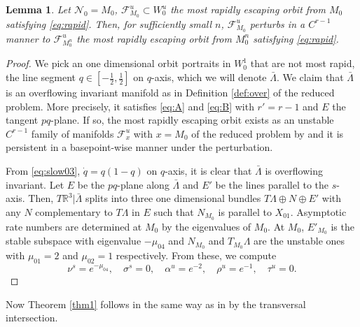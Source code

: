 \documentclass[a4paper,11pt]{article}
\newtheorem{lemma}{Lemma}[section]
\theoremstyle{remark}
\begin{document}
\begin{lemma} \label{lem:rapid}
 Let $\mathcal{N}_0=M_0$, $\mathcal{F}^u_{M_0}\subset W_0^u$ the most rapidly escaping orbit from $M_0$ satisfying \eqref{eq:rapid}. Then, for sufficiently small $n$, $\mathcal{F}^u_{M_0}$ perturbs in a $C^{r-1}$ manner to $\mathcal{F}^u_{M_0^n}$ the most rapidly escaping orbit from $M_0^n$ satisfying \eqref{eq:rapid}. 
\end{lemma}
\begin{proof}
 We pick an one dimensional orbit portraits in $W_0^1$ that are not most rapid, the line segment $q\in [- \frac{1}{2}, \frac{1}{2}]$ on $q$-axis, which we will denote $\bar{\Lambda}$. We claim that $\bar\Lambda$ is an overflowing invariant manifold as in Definition \ref{def:over} of the reduced problem. More precisely, it satisfies \eqref{eq:A} and \eqref{eq:B} with $r'=r-1$ and $E$ the tangent $pq$-plane. If so, the most rapidly escaping orbit exists as an unstable $C^{r-1}$ family of manifolds $\mathcal{F}^u_x$ with $x=M_0$ of the reduced problem by \cite[Theorem 3]{fenichel_asymptotic_1977} and it is persistent in a basepoint-wise manner under the perturbation.
 
 From \eqref{eq:slow03}, $\dot{q}=q(1-q)$ on $q$-axis, it is clear that $\bar\Lambda$ is overflowing invariant. Let $E$ be the $pq$-plane along $\bar{\Lambda}$ and $E'$ be the lines parallel to the $s$-axis. Then, $T \mathbb{R}^3|\bar\Lambda$ splits into three one dimensional bundles $T\Lambda\oplus N \oplus E'$ with any $N$ complementary to $T\Lambda$ in $E$ such that $N_{M_0}$ is parallel to $X_{01}$.  %
 Asymptotic rate numbers are determined at $M_0$ by the eigenvalues of $M_0$. At $M_0$, $E'_{M_0}$ is the stable subspace with eigenvalue $-\mu_{04}$ and $N_{M_0}$ and $T_{M_0}\Lambda$ are the unstable ones with $\mu_{01}=2$ and $\mu_{02}=1$ respectively. From these, we compute 
 $$ \nu^s = e^{-\mu_{04}}, \quad\sigma^s = 0, \quad\alpha^u = e^{-2}, \quad\rho^u=e^{-1}, \quad\tau^u=0.$$
\end{proof}

Now Theorem \ref{thm1} follows in the same way as in \cite[Theorem 3.1]{Sz1991} by the transversal intersection.
\end{document}
